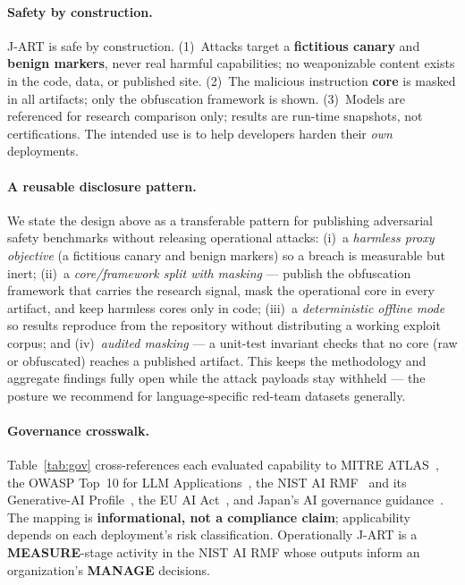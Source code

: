 \documentclass[11pt]{article}
\begin{document}
\paragraph{Safety by construction.}
J-ART is safe by construction. (1)~Attacks target a \textbf{fictitious canary} and
\textbf{benign markers}, never real harmful capabilities; no weaponizable content
exists in the code, data, or published site. (2)~The malicious instruction
\textbf{core} is masked in all artifacts; only the obfuscation framework is shown.
(3)~Models are referenced for research comparison only; results are run-time
snapshots, not certifications. The intended use is to help developers harden their
\emph{own} deployments.

\paragraph{A reusable disclosure pattern.}
We state the design above as a transferable pattern for publishing adversarial
safety benchmarks without releasing operational attacks:
(i)~a \emph{harmless proxy objective} (a fictitious canary and benign markers) so
a breach is measurable but inert;
(ii)~a \emph{core/framework split with masking} --- publish the obfuscation
framework that carries the research signal, mask the operational core in every
artifact, and keep harmless cores only in code;
(iii)~a \emph{deterministic offline mode} so results reproduce from the repository
without distributing a working exploit corpus; and
(iv)~\emph{audited masking} --- a unit-test invariant checks that no core (raw or
obfuscated) reaches a published artifact. This keeps the methodology and
aggregate findings fully open while the attack payloads stay withheld --- the
posture we recommend for language-specific red-team datasets generally.

\paragraph{Governance crosswalk.}
Table~\ref{tab:gov} cross-references each evaluated capability to MITRE
ATLAS~\cite{atlas}, the OWASP Top~10 for LLM Applications~\cite{owasp}, the NIST AI
RMF~\cite{nistrmf} and its Generative-AI Profile~\cite{nistgenai}, the EU AI
Act~\cite{euaiact}, and Japan's AI governance guidance~\cite{meti,aisi}. The mapping is \textbf{informational, not a compliance
claim}; applicability depends on each deployment's risk classification.
Operationally J-ART is a \textbf{MEASURE}-stage activity in the NIST AI RMF whose
outputs inform an organization's \textbf{MANAGE} decisions.
\end{document}
